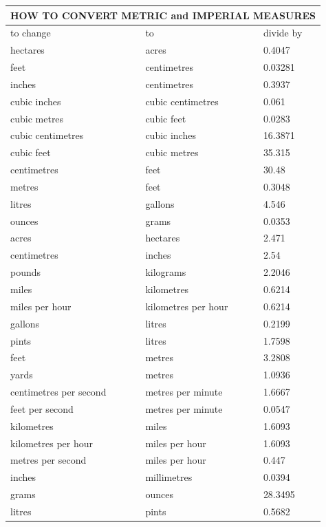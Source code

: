 \documentclass[10pt]{article}
\begin{document}
\begin{center}
\begin{tabular}{|l|l|l|}
\hline
\multicolumn{3}{|c|}{HOW TO CONVERT METRIC and IMPERIAL MEASURES} \\
\hline
to change & to & divide by \\
\hline
hectares & acres & 0.4047 \\
\hline
feet & centimetres & 0.03281 \\
\hline
inches & centimetres & 0.3937 \\
\hline
cubic inches & cubic centimetres & 0.061 \\
\hline
cubic metres & cubic feet & 0.0283 \\
\hline
cubic centimetres & cubic inches & 16.3871 \\
\hline
cubic feet & cubic metres & 35.315 \\
\hline
centimetres & feet & 30.48 \\
\hline
metres & feet & 0.3048 \\
\hline
litres & gallons & 4.546 \\
\hline
ounces & grams & 0.0353 \\
\hline
acres & hectares & 2.471 \\
\hline
centimetres & inches & 2.54 \\
\hline
pounds & kilograms & 2.2046 \\
\hline
miles & kilometres & 0.6214 \\
\hline
miles per hour & kilometres per hour & 0.6214 \\
\hline
gallons & litres & 0.2199 \\
\hline
pints & litres & 1.7598 \\
\hline
feet & metres & 3.2808 \\
\hline
yards & metres & 1.0936 \\
\hline
centimetres per second & metres per minute & 1.6667 \\
\hline
feet per second & metres per minute & 0.0547 \\
\hline
kilometres & miles & 1.6093 \\
\hline
kilometres per hour & miles per hour & 1.6093 \\
\hline
metres per second & miles per hour & 0.447 \\
\hline
inches & millimetres & 0.0394 \\
\hline
grams & ounces & 28.3495 \\
\hline
litres & pints & 0.5682 \\
\hline

\end{tabular}
\end{center}
\end{document}
